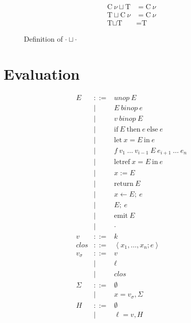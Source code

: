 \documentclass[twocolumn]{article}
\newcommand{\bnfdef}{::=}
\newcommand{\bnfalt}{\mathrel{\mid}}
\newcommand{\kw}[1]{\mbox{#1}}
\newcommand{\join}[2]{#1 \sqcup #2}
\newcommand{\clos}[2]{\left<#1; #2\right>}
\begin{document}
\begin{figure}
\begin{align*}
\join{\kw{C}~ \nu}{\kw{T}} &= \kw{C}~ \nu \\
\join{\kw{T}}{\kw{C}~ \nu} &= \kw{C}~ \nu \\
\join{\kw{T}}{\kw{T}}      &= \kw{T}
\end{align*}
\caption{Definition of $\join{\cdot}{\cdot}$}
\label{def:join}
\end{figure}

\section{Evaluation}

\begin{figure}
\begin{equation*}
\begin{array}{lcl}
  E
     & \bnfdef & unop~ E \\
     & \bnfalt & E~ binop~ e \\
     & \bnfalt & v~ binop~ E \\
     & \bnfalt & \kw{if}~ E~ \kw{then}~ e~ \kw{else}~ e \\
     & \bnfalt & \kw{let}~ x \mathrel{=} E~ \kw{in}~ e \\
     & \bnfalt & f~ v_1~ \ldots~ v_{i-1}~ E~ e_{i+1}~ \ldots~ e_n \\
     & \bnfalt & \kw{letref}~ x \mathrel{=} E~ \kw{in}~ e \\
     & \bnfalt & x \mathrel{:=} E \\
     & \bnfalt & \kw{return}~ E \\
     & \bnfalt & x \mathrel{\leftarrow} E;~ e \\
     & \bnfalt & E;~ e \\
     & \bnfalt & \kw{emit}~ E \\
     & \bnfalt & \cdot \\
  v
     & \bnfdef & k \\
  clos
     & \bnfdef & \clos{x_1, \ldots, x_n}{e} \\
  v_\sigma
     & \bnfdef & v \\
     & \bnfalt & \ell \\
     & \bnfalt & clos \\
  \Sigma
     & \bnfdef & \emptyset \\
     & \bnfalt & x = v_\sigma, \Sigma \\
  H
     & \bnfdef & \emptyset \\
     & \bnfalt & \ell = v, H \\

\end{array}
\end{equation*}
\end{figure}
\end{document}
